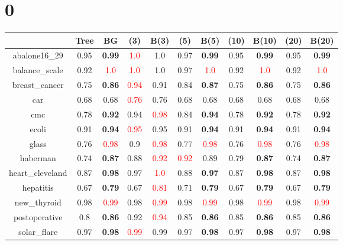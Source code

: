 \documentclass{article}%
\begin{document}
%
\normalsize%
\section*{0}%
\begin{tabular}{c|cccccccccc}%
\hline%
&Tree&BG&(3)&B(3)&(5)&B(5)&(10)&B(10)&(20)&B(20)\\%
\hline%
abalone16\_29&0.95&\textbf{0.99}&\textcolor{red}{ 
1.0
}&1.0&0.97&\textbf{0.99}&0.95&\textbf{0.99}&0.95&\textbf{0.99}\\%
\hline%
balance\_scale&0.92&\textcolor{red}{ 
1.0
}&\textcolor{red}{ 
1.0
}&1.0&0.97&\textcolor{red}{ 
1.0
}&0.92&\textcolor{red}{ 
1.0
}&0.92&\textcolor{red}{ 
1.0
}\\%
\hline%
breast\_cancer&0.75&\textbf{0.86}&\textcolor{red}{ 
0.94
}&0.91&0.84&\textbf{0.87}&0.75&\textbf{0.86}&0.75&\textbf{0.86}\\%
\hline%
car&0.68&0.68&\textcolor{red}{ 
0.76
}&0.76&0.68&0.68&0.68&0.68&0.68&0.68\\%
\hline%
cmc&0.78&\textbf{0.92}&0.94&\textcolor{red}{ 
0.98
}&0.84&\textbf{0.94}&0.78&\textbf{0.92}&0.78&\textbf{0.92}\\%
\hline%
ecoli&0.91&\textbf{0.94}&\textcolor{red}{ 
0.95
}&0.95&0.91&\textbf{0.94}&0.91&\textbf{0.94}&0.91&\textbf{0.94}\\%
\hline%
glass&0.76&\textcolor{red}{ 
0.98
}&0.9&\textcolor{red}{ 
0.98
}&0.77&\textcolor{red}{ 
0.98
}&0.76&\textcolor{red}{ 
0.98
}&0.76&\textcolor{red}{ 
0.98
}\\%
\hline%
haberman&0.74&\textbf{0.87}&0.88&\textcolor{red}{ 
0.92
}&\textcolor{red}{ 
0.92
}&0.89&0.79&\textbf{0.87}&0.74&\textbf{0.87}\\%
\hline%
heart\_cleveland&0.87&\textbf{0.98}&0.97&\textcolor{red}{ 
1.0
}&0.88&\textbf{0.97}&0.87&\textbf{0.98}&0.87&\textbf{0.98}\\%
\hline%
hepatitis&0.67&\textbf{0.79}&0.67&\textcolor{red}{ 
0.81
}&0.71&\textbf{0.79}&0.67&\textbf{0.79}&0.67&\textbf{0.79}\\%
\hline%
new\_thyroid&0.98&\textcolor{red}{ 
0.99
}&0.98&\textcolor{red}{ 
0.99
}&0.98&\textcolor{red}{ 
0.99
}&0.98&\textcolor{red}{ 
0.99
}&0.98&\textcolor{red}{ 
0.99
}\\%
\hline%
postoperative&0.8&\textbf{0.86}&0.92&\textcolor{red}{ 
0.94
}&0.85&\textbf{0.86}&0.85&\textbf{0.86}&0.85&\textbf{0.86}\\%
\hline%
solar\_flare&0.97&\textbf{0.98}&\textcolor{red}{ 
0.99
}&0.99&0.97&\textbf{0.98}&0.97&\textbf{0.98}&0.97&\textbf{0.98}\\%

\end{tabular}
\end{document}

